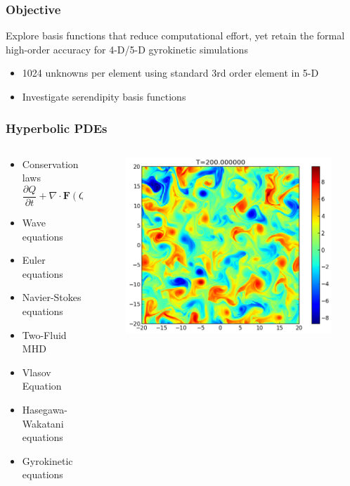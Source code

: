 \documentclass[serif,12pt]{beamer}
\begin{document}
\begin{frame}
\frametitle{Objective}
	Explore basis functions that reduce computational effort, yet retain the formal high-order accuracy for 4-D/5-D gyrokinetic simulations
	\begin{itemize}
		\item 1024 unknowns per element using standard 3rd order element in 5-D
		\item Investigate serendipity basis functions
	\end{itemize}
\end{frame}

\begin{frame}
\frametitle{Hyperbolic PDEs}

\begin{columns}
	\begin{column}{0.5\linewidth}
		\begin{itemize}
			\item Conservation laws \[ \frac{\partial Q}{\partial t} + \nabla \cdot \boldsymbol{F}(Q) = \psi(Q)\]
			\item Wave equations
			\item Euler equations
			\item Navier-Stokes equations
			\item Two-Fluid MHD
			\item Vlasov Equation
			\item Hasegawa-Wakatani equations
			\item Gyrokinetic equations
		\end{itemize}
	\end{column}

	\begin{column}{0.4\linewidth}
		\begin{figure}
			\includegraphics[width=\textwidth]{figures/s217-hw_numDens_00100.png}
		\end{figure}
	\end{column}
\end{columns}
\end{frame}
\end{document}
